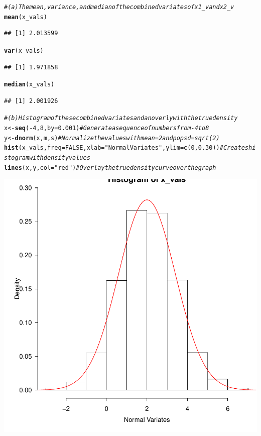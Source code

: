 \documentclass{article}\usepackage[]{graphicx}\usepackage[]{color}
\makeatletter
\newcommand{\hlnum}[1]{\textcolor[rgb]{0.686,0.059,0.569}{#1}}%
\newcommand{\hlstr}[1]{\textcolor[rgb]{0.192,0.494,0.8}{#1}}%
\newcommand{\hlcom}[1]{\textcolor[rgb]{0.678,0.584,0.686}{\textit{#1}}}%
\newcommand{\hlopt}[1]{\textcolor[rgb]{0,0,0}{#1}}%
\newcommand{\hlstd}[1]{\textcolor[rgb]{0.345,0.345,0.345}{#1}}%
\newcommand{\hlkwb}[1]{\textcolor[rgb]{0.69,0.353,0.396}{#1}}%
\newcommand{\hlkwc}[1]{\textcolor[rgb]{0.333,0.667,0.333}{#1}}%
\newcommand{\hlkwd}[1]{\textcolor[rgb]{0.737,0.353,0.396}{\textbf{#1}}}%
\newenvironment{kframe}{%
 \def\at@end@of@kframe{}%
 \ifinner\ifhmode%
  \def\at@end@of@kframe{\end{minipage}}%
  \begin{minipage}{\columnwidth}%
 \fi\fi%
 \def\FrameCommand##1{\hskip\@totalleftmargin \hskip-\fboxsep
 \colorbox{shadecolor}{##1}\hskip-\fboxsep
     \hskip-\linewidth \hskip-\@totalleftmargin \hskip\columnwidth}%
 \MakeFramed {\advance\hsize-\width
   \@totalleftmargin\z@ \linewidth\hsize
   \@setminipage}}%
 {\par\unskip\endMakeFramed%
 \at@end@of@kframe}
\newenvironment{knitrout}{}{} %
\makeatother
\begin{document}
\begin{knitrout}
\begin{kframe}
\begin{alltt}
\hlcom{#(a) The mean, variance, and median of the combined variates of x1_v and x2_v}
\hlkwd{mean}\hlstd{(x_vals)}
\end{alltt}
\begin{verbatim}
## [1] 2.013599
\end{verbatim}
\begin{alltt}
\hlkwd{var}\hlstd{(x_vals)}
\end{alltt}
\begin{verbatim}
## [1] 1.971858
\end{verbatim}
\begin{alltt}
\hlkwd{median}\hlstd{(x_vals)}
\end{alltt}
\begin{verbatim}
## [1] 2.001926
\end{verbatim}
\begin{alltt}
\hlcom{#(b) Histogram of these combined variates and an overly with the true density}
\hlstd{x} \hlkwb{<-} \hlkwd{seq}\hlstd{(}\hlopt{-}\hlnum{4}\hlstd{,} \hlnum{8}\hlstd{,} \hlkwc{by}\hlstd{=}\hlnum{0.001}\hlstd{)} \hlcom{#Generate a sequence of numbers from -4 to 8}
\hlstd{y} \hlkwb{<-} \hlkwd{dnorm}\hlstd{(x, m, s)} \hlcom{#Normalize the values with mean=2 and pop sd=sqrt(2)}
\hlkwd{hist}\hlstd{(x_vals,} \hlkwc{freq} \hlstd{=} \hlnum{FALSE}\hlstd{,} \hlkwc{xlab}\hlstd{=}\hlstr{"Normal Variates"}\hlstd{,} \hlkwc{ylim}\hlstd{=}\hlkwd{c}\hlstd{(}\hlnum{0}\hlstd{,}\hlnum{0.30}\hlstd{))}      \hlcom{#Creates histogram with density values}
\hlkwd{lines}\hlstd{(x,y,}\hlkwc{col} \hlstd{=} \hlstr{"red"}\hlstd{)} \hlcom{#Overlay the true density curve over the graph}
\end{alltt}
\end{kframe}

{\centering \includegraphics[width=.6\linewidth]{figure/FinalLab-Rnwunnamed-chunk-4-1} 

}
\end{knitrout}
\end{document}
